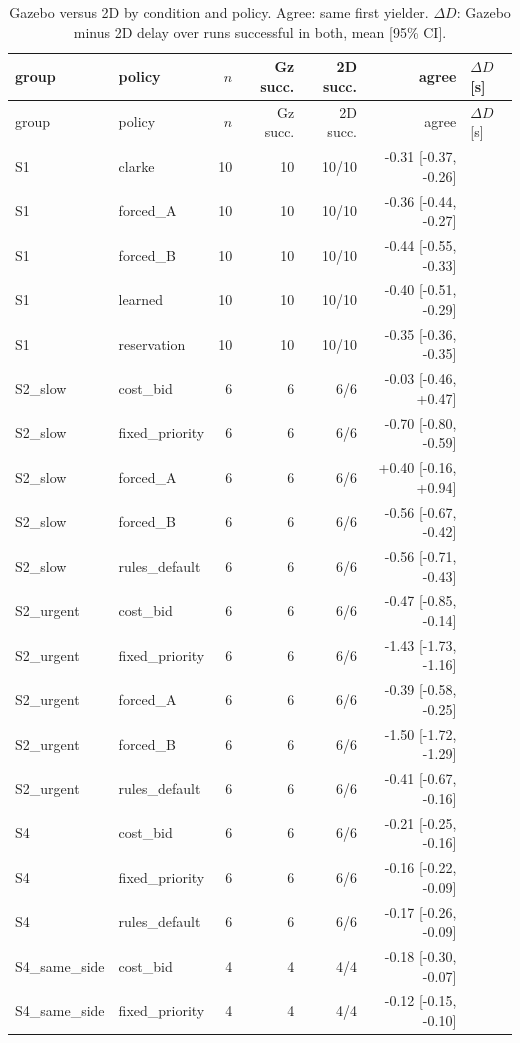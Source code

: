 \documentclass[journal,onecolumn]{IEEEtran}
\begin{document}
{\footnotesize
\begin{longtable}{@{}llrrrrl@{}}
\caption{Gazebo versus 2D by condition and policy. Agree: same first yielder. $\Delta D$: Gazebo minus 2D delay over runs successful in both, mean [95\% CI].}\label{tab:gzcond}\\
\toprule group & policy & $n$ & Gz succ. & 2D succ. & agree & $\Delta D$ [s] \\\midrule\endfirsthead
\toprule group & policy & $n$ & Gz succ. & 2D succ. & agree & $\Delta D$ [s] \\\midrule\endhead
S1 & clarke & 10 & 10 & 10/10 & -0.31 [-0.37, -0.26] \\
S1 & forced\_A & 10 & 10 & 10/10 & -0.36 [-0.44, -0.27] \\
S1 & forced\_B & 10 & 10 & 10/10 & -0.44 [-0.55, -0.33] \\
S1 & learned & 10 & 10 & 10/10 & -0.40 [-0.51, -0.29] \\
S1 & reservation & 10 & 10 & 10/10 & -0.35 [-0.36, -0.35] \\
S2\_slow & cost\_bid & 6 & 6 & 6/6 & -0.03 [-0.46, +0.47] \\
S2\_slow & fixed\_priority & 6 & 6 & 6/6 & -0.70 [-0.80, -0.59] \\
S2\_slow & forced\_A & 6 & 6 & 6/6 & +0.40 [-0.16, +0.94] \\
S2\_slow & forced\_B & 6 & 6 & 6/6 & -0.56 [-0.67, -0.42] \\
S2\_slow & rules\_default & 6 & 6 & 6/6 & -0.56 [-0.71, -0.43] \\
S2\_urgent & cost\_bid & 6 & 6 & 6/6 & -0.47 [-0.85, -0.14] \\
S2\_urgent & fixed\_priority & 6 & 6 & 6/6 & -1.43 [-1.73, -1.16] \\
S2\_urgent & forced\_A & 6 & 6 & 6/6 & -0.39 [-0.58, -0.25] \\
S2\_urgent & forced\_B & 6 & 6 & 6/6 & -1.50 [-1.72, -1.29] \\
S2\_urgent & rules\_default & 6 & 6 & 6/6 & -0.41 [-0.67, -0.16] \\
S4 & cost\_bid & 6 & 6 & 6/6 & -0.21 [-0.25, -0.16] \\
S4 & fixed\_priority & 6 & 6 & 6/6 & -0.16 [-0.22, -0.09] \\
S4 & rules\_default & 6 & 6 & 6/6 & -0.17 [-0.26, -0.09] \\
S4\_same\_side & cost\_bid & 4 & 4 & 4/4 & -0.18 [-0.30, -0.07] \\
S4\_same\_side & fixed\_priority & 4 & 4 & 4/4 & -0.12 [-0.15, -0.10] \\

\end{longtable}}
\end{document}
